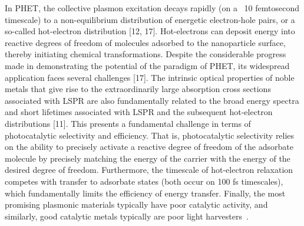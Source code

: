 \documentclass[journal=jpclcd,manuscript=letter]{achemso}
\begin{document}
In PHET, the collective plasmon excitation decays rapidly (on a ~10 femtosecond timescale) to a non-equilibrium distribution of energetic electron-hole pairs, or a so-called hot-electron distribution [12, 17].  
Hot-electrons can deposit energy into reactive degrees of freedom of molecules adsorbed to the nanoparticle surface, thereby initiating chemical transformations.  Despite the considerable progress made in 
demonstrating the potential of the paradigm of PHET, its widespread application faces several challenges [17]. The intrinsic optical properties of noble metals that give rise to the extraordinarily 
large absorption cross sections associated with LSPR are also fundamentally related to the broad energy spectra and short lifetimes associated with LSPR and the subsequent hot-electron distributions [11]. 
This presents a fundamental challenge in terms of photocatalytic selectivity and efficiency.  That is, photocatalytic selectivity relies on the ability to precisely activate a reactive degree of 
freedom of the adsorbate molecule by precisely matching the energy of the carrier with the energy of the desired degree of freedom. Furthermore, the timescale of hot-electron relaxation competes 
with transfer to adsorbate states (both occur on 100 fs timescales), which fundamentally limits the efficiency of energy transfer.  Finally, the most promising plasmonic materials typically have poor catalytic activity, and similarly,
good catalytic metals typically are poor light harvesters~\cite{NordlanderPNAS}.
\end{document}
